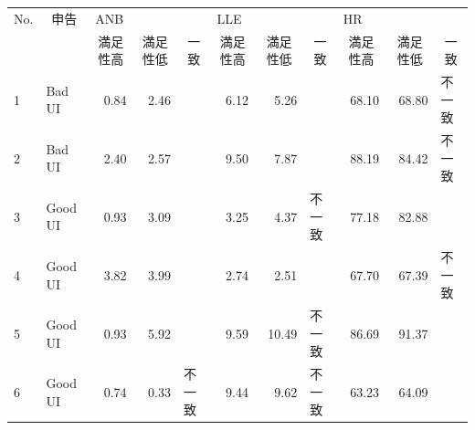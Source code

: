 \begin{landscape}
\begin{table}[htbp]
\centering
\begin{tabular}{llrrlrrlrrl}
\hline
\multicolumn{1}{c}{No.} & \multicolumn{1}{c}{申告} & \multicolumn{3}{l}{ANB}                                                      & \multicolumn{3}{l}{LLE}                                                      & \multicolumn{3}{l}{HR}                                                       \\ \cline{3-11} 
\multicolumn{1}{c}{}    & \multicolumn{1}{c}{}   & \multicolumn{1}{c}{満足性高} & \multicolumn{1}{c}{満足性低} & \multicolumn{1}{c}{一致} & \multicolumn{1}{c}{満足性高} & \multicolumn{1}{c}{満足性低} & \multicolumn{1}{c}{一致} & \multicolumn{1}{c}{満足性高} & \multicolumn{1}{c}{満足性低} & \multicolumn{1}{c}{一致} \\ \hline
1                       & Bad UI                 & 0.84                     & 2.46                     &                        & 6.12                     & 5.26                     &                        & 68.10                    & 68.80                    & 不一致                    \\
2                       & Bad UI                 & 2.40                     & 2.57                     &                        & 9.50                     & 7.87                     &                        & 88.19                    & 84.42                    & 不一致                    \\
3                       & Good UI                & 0.93                     & 3.09                     &                        & 3.25                     & 4.37                     & 不一致                    & 77.18                    & 82.88                    &                        \\
4                       & Good UI                & 3.82                     & 3.99                     &                        & 2.74                     & 2.51                     &                        & 67.70                    & 67.39                    & 不一致                    \\
5                       & Good UI                & 0.93                     & 5.92                     &                        & 9.59                     & 10.49                    & 不一致                    & 86.69                    & 91.37                    &                        \\
6                       & Good UI                & 0.74                     & 0.33                     & 不一致                    & 9.44                     & 9.62                     & 不一致                    & 63.23                    & 64.09                    &                        \\

\end{tabular}
\end{table}
\end{landscape}
